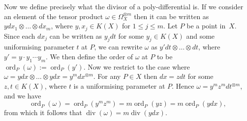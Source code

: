 \documentclass[11pt]{article} %
\theoremstyle{plain}
\theoremstyle{remark}
\newcommand{\cL}{{\mathcal L}}
\DeclareMathOperator{\aut}{Aut}
\DeclareMathOperator{\ord}{ord}
\DeclareMathOperator{\di}{div}
\begin{document}
\begin{comment}
We can define $j\in \aut(X)$ to be the map defined $q_1 \mapsto q_2$ for $q_1, q_2 \in x^{-1}(a)$. 
Obviously this is the identity on the ramification points, and since $x$ is of degree $2$, $j^2$ is the identity map.
We will now use this to show the existence of one more function, $y$, which is necessary to define the basis of $H^0(X,\Omega_X^{\otimes m})$.

If we let $D$ be the divisor $(g+1)p + (g+1)q$ on $k$, then there exists a $y \in \cL(D)$ (unique up to a factor) such that $j^* (y) = -y$.
To start, we have by the Riemann-Roch theorem that $l(D) = \dim\cL(D) = (2g+2)-g+1 = g+3$.
So $\cL(D) \cong k^{g+3}$.
Since $x(p) = x(q) = \infty$ then $j^*$ defines a linear map $\cL(D) \rightarrow \cL(D)$.
Since $j^{*2} = 1$, the eigenvalues must be $\pm 1$, and as such we can decompose $\cL(D)$ in two subspaces, $\cL(D)^+$ and $\cL(D)^-$, corresponding to the eigenspaces of eigenvalues $1$ and $-1$ respectively.
Note that $\cL(D) = \cL(D)^+ \oplus \cL(D)^-$.

If $f\in \cL(D)^+$ then this means that $j^*(f(q))=f(j(q))=f(q)$ for all $q \in X$.
But $x$ maps $q$ and $j(q)$, and only these two points, to the same point in $\mathbb P_k^1$ for all $q\in X$.
So any meromorphic function in $\cL(D)^+$ can be written as a composition of $x$ and a meromorphic function on $\mathbb P_k^1$, such that the composition only has poles at $p$ and $q$ (i.e. the meromorphic function on $\mathbb{P}_k^1$ only has poles at infinity.)
The order of the pole at $p$ or $q$ cannot exceed $g+1$, hence $1,x,\ldots ,x^{g+1}$ forms a basis of $\cL(D)^+$.
As this implies that $\dim\cL(D)^+ = g+2$, and as $\dim\cL(D) = g+3$, we see that $\dim\cL(D)^- = 1$, and so there is a non-trivial meromorphic function $y \in \cL(D)$ such that $j^*(y) = -y$.
This is the $y$ we will use in the following proposition.\\
\end{comment}


Now we define precisely what the divisor of a poly-differential is.
If we consider an element of the tensor product $\omega \in \Omega_X^{\otimes m}$ then it can be written as $y dx_1\otimes \ldots \otimes dx_m$, where $y, x_j \in K(X)$ for $1 \leq j \leq m$.
Let $P$ be a point in~$X$.
Since each $dx_j$ can be written as $y_j dt$ for some $y_j\in K(X)$ and some uniformising parameter $t$ at $P$, we can rewrite $\omega$ as $y' dt \otimes \ldots \otimes dt$, where $y' = y \cdot y_1 \cdots y_m$.
We then define the order of $\omega$ at $P$ to be $\ord_P(\omega ) := \ord_P(y')$.
Now we restrict to the case where $\omega = ydx \otimes \ldots \otimes ydx = y^mdx^{\otimes m}$.
For any $P \in X$ then $dx = zdt$ for some $z,t \in K(X)$, where $t$ is a uniformising parameter at $P$.
Hence $\omega = y^m z^m dt^{\otimes m}$, and we have
\begin{equation*}
	\ord_P(\omega) = \ord_P(y^mz^m) = m\ord_P(yz) = m\ord_P(ydx),
\end{equation*}
from which it follows that $\di(\omega) = m\di(ydx)$.
\end{document}
